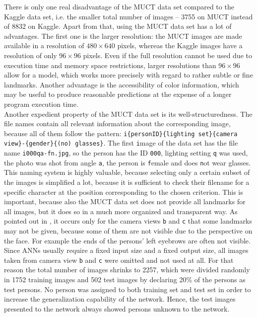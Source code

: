 \documentclass[11pt, a4paper]{article}
\begin{document}
There is only one real disadvantage of the \ac{MUCT} data set compared to the Kaggle data set, i.e. the smaller total number of images -- 3755 on \ac{MUCT} instead of 8832 on Kaggle. Apart from that, using the \ac{MUCT} data set has a lot of advantages. The first one is the larger resolution: the \ac{MUCT} images are made available in a resolution of $480 \times 640$ pixels, whereas the Kaggle images have a resolution of only $96 \times 96$ pixels. Even if the full resolution cannot be used due to execution time and memory space restrictions, larger resolutions than $96 \times 96$ allow for a model, which works more precisely with regard to rather subtle or fine landmarks. Another advantage is the accessibility of color information, which may be useful to produce reasonable predictions at the expense of a longer program execution time.\\
Another expedient property of the \ac{MUCT} data set is its well-structuredness. The file names contain all relevant information about the corresponding image, because all of them follow the pattern: \texttt{i\{personID\}\{lighting set\}\{camera view\}-\{gender\}\{(no) glasses\}}. The first \texttt{i}mage of the data set has the file name \texttt{i000qa-fn.jpg}, so the person has the ID \texttt{000}, lighting setting \texttt{q} was used, the photo was shot from angle \texttt{a}, the person is \texttt{f}emale and does \texttt{n}ot wear glasses.\\
This naming system is highly valuable, because selecting only a certain subset of the images is simplified a lot, because it is sufficient to check their filename for a specific character at the position corresponding to the chosen criterion. This is important, because also the \ac{MUCT} data set does not provide all landmarks for all images, but it does so in a much more organized and transparent way. As pointed out in \cite{muct}, it occurs only for the camera views \texttt{b} and \texttt{c} that some landmarks may not be given, because some of them are not visible due to the perspective on the face. For example the ends of the persons' left eyebrows are often not visible.\\
Since \acp{ANN} usually require a fixed input size and a fixed output size, all images taken from camera view \texttt{b} and \texttt{c} were omitted and not used at all. For that reason the total number of images shrinks to 2257, which were divided randomly in 1752 training images and 502 test images by declaring 20\% of the persons as test persons. No person was assigned to both training set and test set in order to increase the generalization capability of the network. Hence, the test images presented to the network always showed persons unknown to the network.
\end{document}
